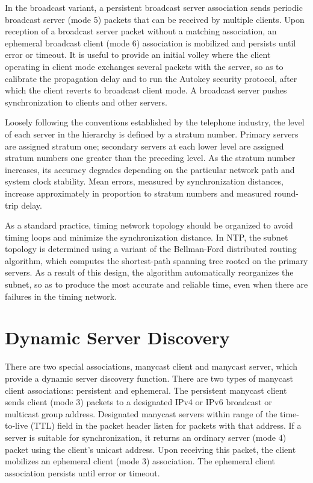 In the broadcast variant, a persistent broadcast server association
sends periodic broadcast server (mode 5) packets that can be received
by multiple clients. Upon reception of a broadcast server packet
without a matching association, an ephemeral broadcast client (mode
6) association is mobilized and persists until error or timeout. It
is useful to provide an initial volley where the client operating in
client mode exchanges several packets with the server, so as to
calibrate the propagation delay and to run the Autokey security
protocol, after which the client reverts to broadcast client mode. A
broadcast server pushes synchronization to clients and other servers.

Loosely following the conventions established by the telephone
industry, the level of each server in the hierarchy is defined by a
stratum number. Primary servers are assigned stratum one; secondary
servers at each lower level are assigned stratum numbers one greater
than the preceding level. As the stratum number increases, its
accuracy degrades depending on the particular network path and system
clock stability. Mean errors, measured by synchronization distances,
increase approximately in proportion to stratum numbers and measured
round-trip delay.

As a standard practice, timing network topology should be organized
to avoid timing loops and minimize the synchronization distance. In
NTP, the subnet topology is determined using a variant of the
Bellman-Ford distributed routing algorithm, which computes the
shortest-path spanning tree rooted on the primary servers. As a
result of this design, the algorithm automatically reorganizes the
subnet, so as to produce the most accurate and reliable time, even
when there are failures in the timing network.

\section{Dynamic Server Discovery}

There are two special associations, manycast client and manycast
server, which provide a dynamic server discovery function. There are
two types of manycast client associations: persistent and ephemeral.
The persistent manycast client sends client (mode 3) packets to a
designated IPv4 or IPv6 broadcast or multicast group address.
Designated manycast servers within range of the time-to-live (TTL)
field in the packet header listen for packets with that address. If
a server is suitable for synchronization, it returns an ordinary
server (mode 4) packet using the client's unicast address. Upon
receiving this packet, the client mobilizes an ephemeral client (mode
3) association. The ephemeral client association persists until
error or timeout.

